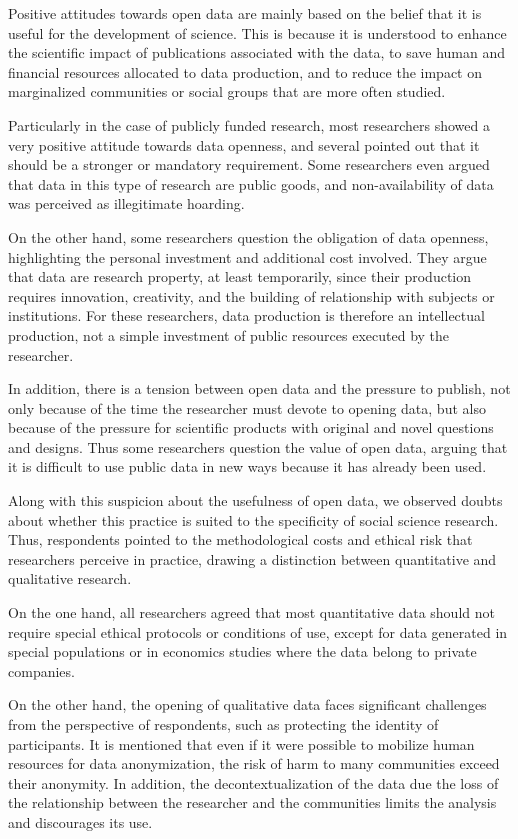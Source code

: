 \documentclass[
  letterpaper,
  DIV=11,
  numbers=noendperiod]{scrartcl}
\begin{document}
Positive attitudes towards open data are mainly based on the belief that
it is useful for the development of science. This is because it is
understood to enhance the scientific impact of publications associated
with the data, to save human and financial resources allocated to data
production, and to reduce the impact on marginalized communities or
social groups that are more often studied.

Particularly in the case of publicly funded research, most researchers
showed a very positive attitude towards data openness, and several
pointed out that it should be a stronger or mandatory requirement. Some
researchers even argued that data in this type of research are public
goods, and non-availability of data was perceived as illegitimate
hoarding.

On the other hand, some researchers question the obligation of data
openness, highlighting the personal investment and additional cost
involved. They argue that data are research property, at least
temporarily, since their production requires innovation, creativity, and
the building of relationship with subjects or institutions. For these
researchers, data production is therefore an intellectual production,
not a simple investment of public resources executed by the researcher.

In addition, there is a tension between open data and the pressure to
publish, not only because of the time the researcher must devote to
opening data, but also because of the pressure for scientific products
with original and novel questions and designs. Thus some researchers
question the value of open data, arguing that it is difficult to use
public data in new ways because it has already been used.

Along with this suspicion about the usefulness of open data, we observed
doubts about whether this practice is suited to the specificity of
social science research. Thus, respondents pointed to the methodological
costs and ethical risk that researchers perceive in practice, drawing a
distinction between quantitative and qualitative research.

On the one hand, all researchers agreed that most quantitative data
should not require special ethical protocols or conditions of use,
except for data generated in special populations or in economics studies
where the data belong to private companies.

On the other hand, the opening of qualitative data faces significant
challenges from the perspective of respondents, such as protecting the
identity of participants. It is mentioned that even if it were possible
to mobilize human resources for data anonymization, the risk of harm to
many communities exceed their anonymity. In addition, the
decontextualization of the data due the loss of the relationship between
the researcher and the communities limits the analysis and discourages
its use.
\end{document}
